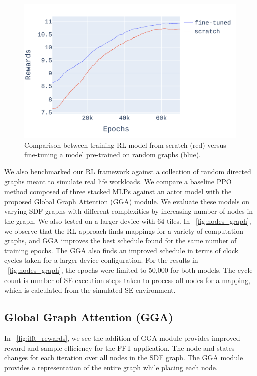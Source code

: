 \begin{figure}[tb]
  \centering
  \includegraphics[width=\linewidth]{fig/pretrain_ifft.pdf}
  \caption{Comparison between training RL model from scratch (red) versus fine-tuning a model pre-trained on random graphs (blue). }
  \label{fig:pretrain_ifft}
\end{figure}

We also benchmarked our RL framework against a collection of random directed graphs meant to simulate real life workloads. 
We compare a baseline PPO method composed of three stacked MLPs against an actor model with the proposed Global Graph Attention (GGA) module.
We evaluate these models on varying SDF graphs with different complexities by increasing number of nodes in the graph. 
We also tested on a larger device with 64 tiles.
In \figurename~\ref{fig:nodes_graph}, we observe that the RL approach finds mappings for a variety of computation graphs, and GGA improves the best schedule found for the same number of training epochs. 
The GGA also finds an improved schedule in terms of clock cycles taken for a larger device configuration. 
For the results in \figurename~\ref{fig:nodes_graph}, the epochs were limited to 50,000 for both models. 
The cycle count is number of SE execution steps taken to process all nodes for a mapping, which is calculated from the simulated SE environment. 



\subsection{Global Graph Attention (GGA)} \label{sec:GGA_result}

In \figurename~\ref{fig:ifft_rewards}, we see the addition of GGA module provides improved reward and sample efficiency for the FFT application. 
The node and states changes for each iteration over all nodes in the SDF graph. The GGA module provides a representation of the entire graph while placing each node.

